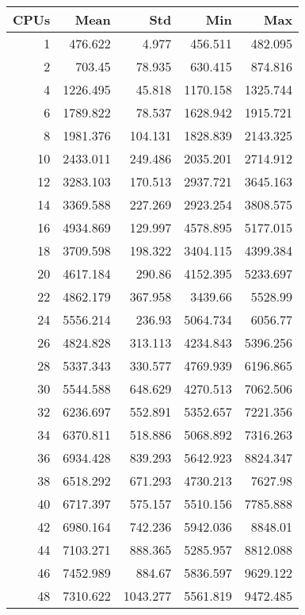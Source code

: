 \begin{table}[htbp]
  \centering
  \begin{minipage}{.45\textwidth}
    \centering
    \scriptsize
\begin{tabular}{rrrrr}
\toprule
\textbf{CPUs} & \textbf{Mean} & \textbf{Std} & \textbf{Min} & \textbf{Max} \\
\midrule
1 & 476.622 & 4.977 & 456.511 & 482.095 \\
2 & 703.45 & 78.935 & 630.415 & 874.816 \\
4 & 1226.495 & 45.818 & 1170.158 & 1325.744 \\
6 & 1789.822 & 78.537 & 1628.942 & 1915.721 \\
8 & 1981.376 & 104.131 & 1828.839 & 2143.325 \\
10 & 2433.011 & 249.486 & 2035.201 & 2714.912 \\
12 & 3283.103 & 170.513 & 2937.721 & 3645.163 \\
14 & 3369.588 & 227.269 & 2923.254 & 3808.575 \\
16 & 4934.869 & 129.997 & 4578.895 & 5177.015 \\
18 & 3709.598 & 198.322 & 3404.115 & 4399.384 \\
20 & 4617.184 & 290.86 & 4152.395 & 5233.697 \\
22 & 4862.179 & 367.958 & 3439.66 & 5528.99 \\
24 & 5556.214 & 236.93 & 5064.734 & 6056.77 \\
26 & 4824.828 & 313.113 & 4234.843 & 5396.256 \\
28 & 5337.343 & 330.577 & 4769.939 & 6196.865 \\
30 & 5544.588 & 648.629 & 4270.513 & 7062.506 \\
32 & 6236.697 & 552.891 & 5352.657 & 7221.356 \\
34 & 6370.811 & 518.886 & 5068.892 & 7316.263 \\
36 & 6934.428 & 839.293 & 5642.923 & 8824.347 \\
38 & 6518.292 & 671.293 & 4730.213 & 7627.98 \\
40 & 6717.397 & 575.157 & 5510.156 & 7785.888 \\
42 & 6980.164 & 742.236 & 5942.036 & 8848.01 \\
44 & 7103.271 & 888.365 & 5285.957 & 8812.088 \\
46 & 7452.989 & 884.67 & 5836.597 & 9629.122 \\
48 & 7310.622 & 1043.277 & 5561.819 & 9472.485 \\
\bottomrule
\end{tabular}


\end{minipage}
\end{table}

